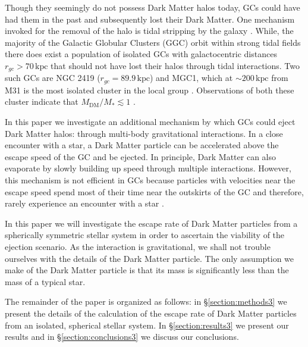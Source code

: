\documentclass[aps,floatfix,prd,showpacs]{revtex4}
\newcommand{\MDM}{M_{\mathrm{DM}}}
\newcommand{\kpc}{\textrm{kpc}}
\begin{document}


Though they seemingly do not possess Dark Matter halos today, GCs could have had them in the past and subsequently lost their Dark Matter. One mechanism invoked for the removal of the halo is tidal stripping by the galaxy \cite{Bromm2002,Mashchenko2005}. While, the majority of the Galactic Globular Clusters (GGC) orbit within strong tidal fields there does exist a population of isolated GCs with galactocentric distances $r_{gc} > 70\, \kpc$ that should not have lost their halos through tidal interactions. Two such GCs are NGC 2419 ($r_{gc} = 89.9\, \kpc$) and MGC1, which at $\sim 200\, \kpc$ from M31 is the most isolated cluster in the local group \cite {Harris, Conroy,Mackey2010}. Observations of both these cluster indicate that $\MDM/M_* \lesssim 1$ \cite{Conroy,Ibata2013}.


In this paper we investigate an additional mechanism by which GCs could eject Dark Matter halos: through multi-body gravitational interactions. In a close encounter with a star, a Dark Matter particle can be accelerated above the escape speed of the GC and be ejected. In principle, Dark Matter can also evaporate by slowly building up speed through multiple interactions. However, this mechanism is not efficient in GCs because particles with velocities near the escape speed spend most of their time near the outskirts of the GC and therefore, rarely experience an encounter with a star \cite{HenonB}. 

In this paper we will investigate the escape rate of Dark Matter particles from a spherically symmetric stellar system in order to ascertain the viability of the ejection scenario. As the interaction is gravitational, we shall not trouble ourselves with the details of the Dark Matter particle. The only assumption we make of the Dark Matter particle is that its mass is significantly less than the mass of a typical star.


The remainder of the paper is organized as follows: in \S\ref{section:methods3} we present the details of the calculation of the escape rate of Dark Matter particles from an isolated, spherical stellar system. In \S\ref{section:results3} we present our results and in \S\ref{section:conclusions3} we discuss our conclusions.
\end{document}
